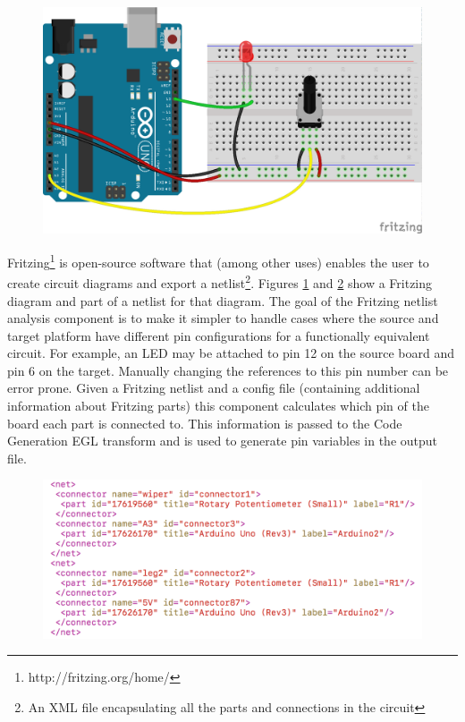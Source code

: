 \documentclass{UoYCSproject}
\begin{document}
\begin{figure}[h!]
  \centering
  \includegraphics[width=0.6\linewidth]{graphics/fritzing_graphic.png}
  \label{fig:fritz_graph}
\end{figure}

Fritzing\footnote{http://fritzing.org/home/} is open-source software that (among other uses) enables the user to create circuit diagrams and export a netlist\footnote{An XML file encapsulating all the parts and connections in the circuit}. Figures \ref{fig:fritz_graph} and \ref{fig:fritz_net} show a Fritzing diagram and part of a netlist for that diagram. The goal of the Fritzing netlist analysis component is to make it simpler to handle cases where the source and target platform have different pin configurations for a functionally equivalent circuit. For example, an LED may be attached to pin 12 on the source board and pin 6 on the target. Manually changing the references to this pin number can be error prone. Given a Fritzing netlist and a config file (containing additional information about Fritzing parts) this component calculates which pin of the board each part is connected to. This information is passed to the Code Generation EGL transform and is used to generate pin variables in the output file.

\begin{figure}[h!]
  \centering
  \includegraphics[width=0.8\linewidth]{graphics/fritzing_netlist.png}
  \label{fig:fritz_net}
\end{figure}
\end{document}
